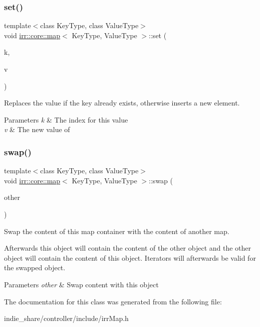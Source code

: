\subsubsection{\texorpdfstring{set()}{set()}}
{\footnotesize\ttfamily template$<$class Key\+Type, class Value\+Type$>$ \\
void \hyperlink{classirr_1_1core_1_1map}{irr\+::core\+::map}$<$ Key\+Type, Value\+Type $>$\+::set (\begin{DoxyParamCaption}\item[{const Key\+Type \&}]{k,  }\item[{const Value\+Type \&}]{v }\end{DoxyParamCaption})\hspace{0.3cm}{\ttfamily [inline]}}



Replaces the value if the key already exists, otherwise inserts a new element. 


\begin{DoxyParams}{Parameters}
{\em k} & The index for this value \\
\hline
{\em v} & The new value of \\
\hline
\end{DoxyParams}
\mbox{\label{classirr_1_1core_1_1map_a411cde5df191c16616e20eb7027b9a20}} 
\subsubsection{\texorpdfstring{swap()}{swap()}}
{\footnotesize\ttfamily template$<$class Key\+Type, class Value\+Type$>$ \\
void \hyperlink{classirr_1_1core_1_1map}{irr\+::core\+::map}$<$ Key\+Type, Value\+Type $>$\+::swap (\begin{DoxyParamCaption}\item[{\hyperlink{classirr_1_1core_1_1map}{map}$<$ Key\+Type, Value\+Type $>$ \&}]{other }\end{DoxyParamCaption})\hspace{0.3cm}{\ttfamily [inline]}}



Swap the content of this map container with the content of another map. 

Afterwards this object will contain the content of the other object and the other object will contain the content of this object. Iterators will afterwards be valid for the swapped object. 
\begin{DoxyParams}{Parameters}
{\em other} & Swap content with this object \\
\hline
\end{DoxyParams}


The documentation for this class was generated from the following file\+:\begin{DoxyCompactItemize}
\item 
indie\+\_\+share/controller/include/irr\+Map.\+h\end{DoxyCompactItemize}
